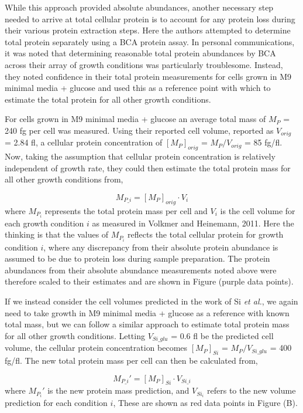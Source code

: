 While this approach provided absolute abundances, another necessary step needed
to arrive at total cellular protein is to account for any protein loss during
their various protein extraction steps. Here the authors attempted to determine
total protein separately using a BCA protein assay.  In personal communications,
it was noted that determining reasonable total protein abundances by BCA across
their array of growth conditions  was particularly troublesome. Instead, they
noted confidence in their total protein measurements for cells grown in M9
minimal media + glucose and  used this as a reference point with which to
estimate the total protein for all other growth conditions.

For cells grown in M9 minimal media + glucose an average total mass of $M_P$ =
240 fg per cell was measured. Using their reported cell volume, reported as
$V_{orig}$ = 2.84 fl, a cellular protein concentration of $[M_P]_{orig}$ =
$M_P/V_{orig}$ = 85 fg/fl. Now, taking the assumption that cellular protein
concentration is relatively independent of growth rate, they could then estimate
the total protein mass for all other growth conditions from,

\begin{equation}
	M_{P\_i} = [M_P]_{orig} \cdot V_{i}
\end{equation}
where $M_{P_i}$ represents the total protein mass per cell and $V_{i}$ is the
cell volume for each growth condition $i$ as measured in Volkmer and Heinemann,
2011. Here the thinking is that the values of $M_{P_i}$ reflects the total
cellular protein for growth condition $i$, where any discrepancy from their
absolute protein abundance is assumed to be due to protein loss during sample
preparation. The protein abundances from their absolute abundance measurements
noted above were therefore scaled to their estimates and are  shown in Figure
 (purple data points).

If we instead consider the cell volumes predicted in the work of Si \textit{et
al.}, we again need to take growth in M9 minimal media + glucose as a reference
with known total mass, but we can follow a similar approach to estimate total
protein mass for all other growth conditions. Letting  $V_{Si\_glu}$ = 0.6 fl be
the predicted cell volume, the cellular protein concentration becomes
$[M_P]_{Si}$ = $M_P/V_{Si\_glu}$ = 400 fg/fl. The new total protein mass per
cell can then be calculated from,

\begin{equation}
	M_{P\_i}' = [M_P]_{Si} \cdot V_{Si\_i}
\end{equation}
where $M_{P_i}'$ is the new protein mass prediction, and $V_{Si_i}$ refers to
the new volume prediction for each condition $i$, These are shown as red data points in
Figure (B).


